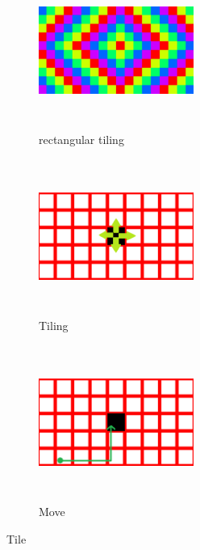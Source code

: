 \begin{figure}[h!tbp]
   \begin{subfigure}{0.3\textwidth}
   \begin{center}
    \includegraphics[width=2in, height=2in, keepaspectratio]{../img/tessellation/rectTile.pdf}
    \caption{rectangular tiling}
    \label{fig:rectTile}
   \end{center}
  \end{subfigure}
 \hspace*{\fill}
   \begin{subfigure}{0.3\textwidth}
   \begin{center}
    \includegraphics[width=2in, height=2in, keepaspectratio]{../img/tessellation/tile.pdf}
    \caption{Tiling}
    \label{fig:tile}
   \end{center}
  \end{subfigure}
 \hspace*{\fill}
 \begin{subfigure}{0.3\textwidth}
  \begin{center}
   \includegraphics[width=2in, height=2in, keepaspectratio]{../img/tessellation/tileMove.pdf}
   \caption{Move}
   \label{fig:tileMove}
  \end{center}
 \end{subfigure}
 \hspace*{\fill}
\caption{Tile}
\end{figure}

